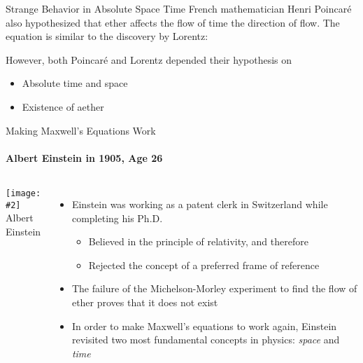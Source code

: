 \documentclass[12pt,compress,aspectratio=169]{beamer}
\newcommand{\pic}[2]{\texttt{[image: \#2]}}
\newcommand{\bigsqrt}{\ensuremath\sqrt{1-\left(\frac{v}{c}\right)^2}}
\newcommand{\eq}[2]{\vspace{#1}{\Large\begin{displaymath}#2\end{displaymath}}}
\begin{document}
\begin{frame}{Strange Behavior in Absolute Space Time}
  French mathematician Henri Poincar\'{e} also hypothesized that ether affects
  the flow of time the direction of flow. The equation is similar to the
  discovery by Lorentz:

  \eq{-.2in}{
    \boxed{t' =\frac{t}{\bigsqrt}}
  }

  However, both Poincar\'{e} and Lorentz depended their hypothesis on
  \begin{itemize}
  \item Absolute time and space
  \item Existence of aether
  \end{itemize}
\end{frame}

\begin{frame}{Making Maxwell's Equations Work}
  \framesubtitle{Albert Einstein in 1905, Age 26}
  \begin{columns}
    \pic{1.1}{graphics/Einstein_patentoffice.jpg}\\
    {\footnotesize Albert Einstein}
  
    \begin{itemize}
    \item Einstein was working as a patent clerk in Switzerland while completing
      his Ph.D.
      \begin{itemize}
      \item Believed in the principle of relativity, and therefore
      \item Rejected the concept of a preferred frame of reference
      \end{itemize}
    \item The failure of the Michelson-Morley experiment to find the flow of
      ether proves that it does not exist
    \item In order to make Maxwell's equations to work again, Einstein
      revisited two most fundamental concepts in physics: \emph{space} and
      \emph{time}
    \end{itemize}
  \end{columns}
\end{frame}
\end{document}
